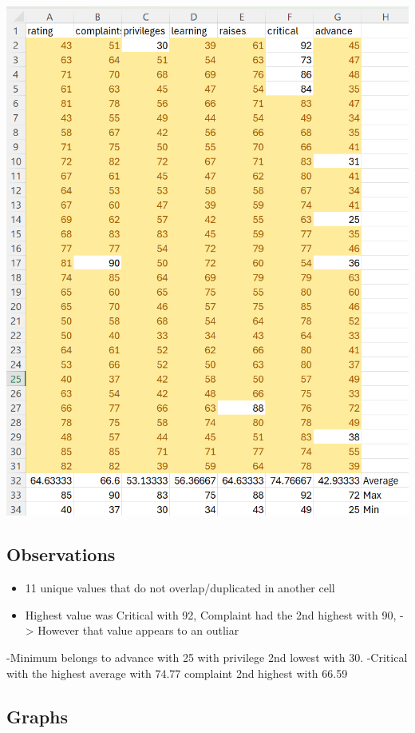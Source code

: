 \documentclass[
  letterpaper,
  DIV=11,
  numbers=noendperiod]{scrreprt}
\providecommand{\tightlist}{%
  \setlength{\itemsep}{0pt}\setlength{\parskip}{0pt}}\usepackage{longtable,booktabs,array}
\begin{document}
\includegraphics{./Excel_1_Unit/Week1_Diego/Week_1DJ/screenshots/Attitude_Base2.png}

\subsection{Observations}\label{observations-1}

\begin{itemize}
\tightlist
\item
  11 unique values that do not overlap/duplicated in another cell
\item
  Highest value was Critical with 92, Complaint had the 2nd highest with
  90, -\textgreater{} However that value appears to an outliar
\end{itemize}

-Minimum belongs to advance with 25 with privilege 2nd lowest with 30.
-Critical with the highest average with 74.77 complaint 2nd highest with
66.59

\subsection{Graphs}\label{graphs}
\end{document}
